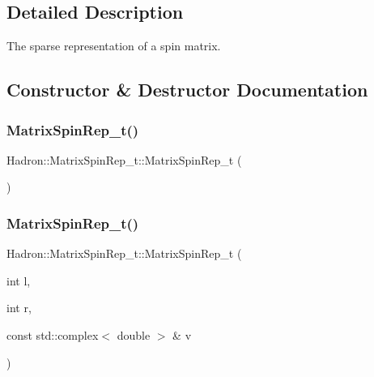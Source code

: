 \subsection{Detailed Description}
The sparse representation of a spin matrix. 

\subsection{Constructor \& Destructor Documentation}
\mbox{\label{structHadron_1_1MatrixSpinRep__t_a38258a85d8bc13c1f94ef0958795a49e}} 
\subsubsection{\texorpdfstring{MatrixSpinRep\_t()}{MatrixSpinRep\_t()}\hspace{0.1cm}{\footnotesize\ttfamily [1/4]}}
{\footnotesize\ttfamily Hadron\+::\+Matrix\+Spin\+Rep\+\_\+t\+::\+Matrix\+Spin\+Rep\+\_\+t (\begin{DoxyParamCaption}{ }\end{DoxyParamCaption})\hspace{0.3cm}{\ttfamily [inline]}}

\mbox{\label{structHadron_1_1MatrixSpinRep__t_a3a057c50dbc88ead180122518485973c}} 
\subsubsection{\texorpdfstring{MatrixSpinRep\_t()}{MatrixSpinRep\_t()}\hspace{0.1cm}{\footnotesize\ttfamily [2/4]}}
{\footnotesize\ttfamily Hadron\+::\+Matrix\+Spin\+Rep\+\_\+t\+::\+Matrix\+Spin\+Rep\+\_\+t (\begin{DoxyParamCaption}\item[{int}]{l,  }\item[{int}]{r,  }\item[{const std\+::complex$<$ double $>$ \&}]{v }\end{DoxyParamCaption})\hspace{0.3cm}{\ttfamily [inline]}}

